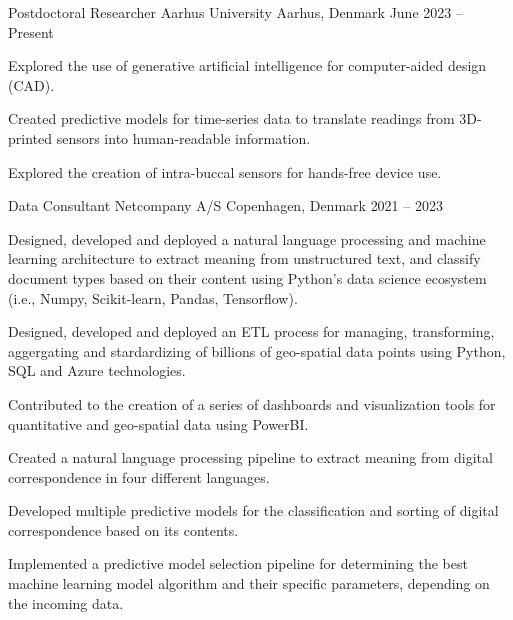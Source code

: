 

\begin{cventries}
  \cventry
    {Postdoctoral Researcher}
    {Aarhus University}
    {Aarhus, Denmark}
    {June 2023 -- Present}
    {
      \begin{cvitems}
        \item Explored the use of generative artificial intelligence for computer-aided design (CAD).
        \item Created predictive models for time-series data to translate
        readings from 3D-printed sensors into human-readable information.
        \item Explored the creation of intra-buccal sensors for hands-free
        device use.
      \end{cvitems}
      \vspace{1em}
    }
  \cventry
    {Data Consultant}
    {Netcompany A/S}
    {Copenhagen, Denmark}
    {2021 -- 2023}
    {
      \begin{cvitems}
        \item Designed, developed and deployed a natural language processing and
        machine learning architecture to extract meaning from unstructured text,
        and classify document types based on their content using Python's data
        science ecosystem (i.e., Numpy, Scikit-learn, Pandas, Tensorflow).
        \item Designed, developed and deployed an ETL process for managing,
        transforming, aggergating and stardardizing of billions of geo-spatial
        data points using Python, SQL and Azure technologies.
        \item Contributed to the creation of a series of dashboards and
        visualization tools for quantitative and geo-spatial data using PowerBI.
        \item Created a natural language processing pipeline to extract meaning from digital correspondence in four different languages.
        \item Developed multiple predictive models for the classification and
        sorting of digital correspondence based on its contents.
        \item Implemented a predictive model selection pipeline for determining
        the best machine learning model algorithm and their specific parameters,
        depending on the incoming data.
      \end{cvitems}
      \vspace{1em}
    }
    

\end{cventries}
